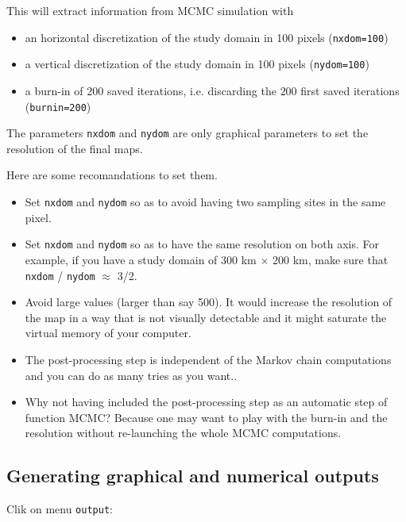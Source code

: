 \documentclass{article}
\begin{document}
\bigskip

This will extract information from  MCMC simulation with 
\begin{itemize}
\item an horizontal  discretization of the study domain in 100 pixels (\texttt{nxdom=100})
\item a vertical  discretization of the study domain in 100 pixels (\texttt{nydom=100})
\item a burn-in of $200$ saved  iterations, i.e. discarding the $200$ first saved iterations (\texttt{burnin=200})
\end{itemize}
The parameters \texttt{nxdom} and \texttt{nydom}  are only graphical parameters 
to set the resolution of the final maps. 


Here are some recomandations to set them.
\begin{itemize}
\item Set \texttt{nxdom} and \texttt{nydom} so as to avoid having two sampling sites in the same pixel.
\item Set \texttt{nxdom} and \texttt{nydom} so as to have the same resolution on both axis. For example, if you have 
a study domain of 300 km $\times$ 200 km, make sure that \texttt{nxdom} / \texttt{nydom} $\approx$ 3/2.
\item Avoid large values (larger than say 500). It would increase the resolution of the map in a way that is not visually detectable and it might saturate the virtual memory of your computer. 
\item The post-processing step is independent of the Markov chain computations and you can do as many tries as you want.. 
\item Why not having included the post-processing step as an automatic step of function MCMC? 
Because one may want to play with the burn-in and the resolution without re-launching the whole MCMC computations.
\end{itemize}


\clearpage
\subsection{Generating graphical and numerical outputs}

Clik on menu \texttt{output}:\\
\end{document}

